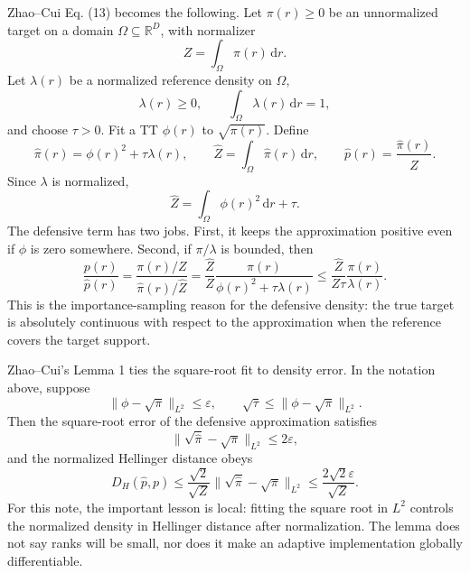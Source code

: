 \documentclass[11pt]{article}
\newcommand{\R}{\mathbb R}
\newcommand{\dd}{\,\mathrm d}
\begin{document}
Zhao--Cui Eq. (13) becomes the following.  Let \(\pi(r)\ge0\) be an
unnormalized target on a domain \(\Omega\subseteq\R^D\), with normalizer
\[
    Z=\int_\Omega \pi(r)\dd r.
\]
Let \(\lambda(r)\) be a normalized reference density on \(\Omega\),
\[
    \lambda(r)\ge0,\qquad \int_\Omega \lambda(r)\dd r=1,
\]
and choose \(\tau>0\).  Fit a TT \(\phi(r)\) to \(\sqrt{\pi(r)}\).  Define
\[
    \widehat\pi(r)
    =
    \phi(r)^2+\tau\lambda(r),
    \qquad
    \widehat Z
    =
    \int_\Omega \widehat\pi(r)\dd r,
    \qquad
    \widehat p(r)
    =
    \frac{\widehat\pi(r)}{\widehat Z}.
    \tag{S1}
\]
Since \(\lambda\) is normalized,
\[
    \widehat Z
    =
    \int_\Omega \phi(r)^2\dd r+\tau.
    \tag{S2}
\]
The defensive term has two jobs.  First, it keeps the approximation positive
even if \(\phi\) is zero somewhere.  Second, if \(\pi/\lambda\) is bounded, then
\[
    \frac{p(r)}{\widehat p(r)}
    =
    \frac{\pi(r)/Z}{\widehat\pi(r)/\widehat Z}
    =
    \frac{\widehat Z}{Z}
    \frac{\pi(r)}{\phi(r)^2+\tau\lambda(r)}
    \le
    \frac{\widehat Z}{Z\tau}
    \frac{\pi(r)}{\lambda(r)}.
    \tag{S3}
\]
This is the importance-sampling reason for the defensive density: the true
target is absolutely continuous with respect to the approximation when the
reference covers the target support.

Zhao--Cui's Lemma 1 ties the square-root fit to density error.  In the notation
above, suppose
\[
    \|\phi-\sqrt{\pi}\|_{L^2}\le \varepsilon,
    \qquad
    \sqrt{\tau}\le \|\phi-\sqrt{\pi}\|_{L^2}.
    \tag{S4}
\]
Then the square-root error of the defensive approximation satisfies
\[
    \|\sqrt{\widehat\pi}-\sqrt{\pi}\|_{L^2}\le 2\varepsilon,
    \tag{S5}
\]
and the normalized Hellinger distance obeys
\[
    D_H(\widehat p,p)
    \le
    \frac{\sqrt{2}}{\sqrt Z}
    \|\sqrt{\widehat\pi}-\sqrt{\pi}\|_{L^2}
    \le
    \frac{2\sqrt{2}\varepsilon}{\sqrt Z}.
    \tag{S6}
\]
For this note, the important lesson is local: fitting the square root in
\(L^2\) controls the normalized density in Hellinger distance after
normalization.  The lemma does not say ranks will be small, nor does it make an
adaptive implementation globally differentiable.

\begin{center}
\end{center}
\end{document}
